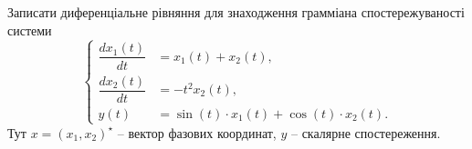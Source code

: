 \setcounter{section}{4}

\setcounter{problem}{6}

\begin{problem}
    Записати диференціальне рівняння для знаходження грамміана спостережуваності системи
    \begin{equation*}
        \left\{
            \begin{aligned}
                \dfrac{dx_1(t)}{dt} &= x_1(t) + x_2(t), \\
                \dfrac{dx_2(t)}{dt} &= - t^2x_2(t), \\
                y(t) &= \sin (t) \cdot x_1(t) + \cos (t) \cdot x_2(t).
            \end{aligned}   
        \right.
    \end{equation*}
    Тут $x = (x_1, x_2)^\star$ -- вектор фазових координат, $y$ -- скалярне спостереження.
\end{problem}

